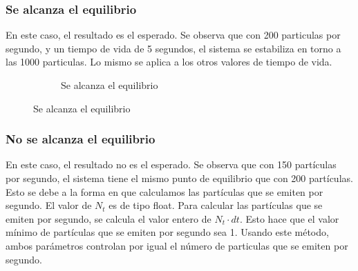 \documentclass{article}
\begin{document}
\subsubsection{Se alcanza el equilibrio}

En este caso, el resultado es el esperado. Se observa que con 200 particulas por segundo, y un tiempo de vida de 5 segundos, el sistema se estabiliza en torno a las 1000 particulas. Lo mismo se aplica a los otros valores de tiempo de vida.

\begin{figure}[H]
    \centering
    \begin{subfigure}{0.48\textwidth}
        \centering
        \caption{Se alcanza el equilibrio}
        \label{fig:energy_vs_time_1A}
    \end{subfigure}
\end{figure}

\subsubsection{No se alcanza el equilibrio}

En este caso, el resultado no es el esperado. Se observa que con 150 partículas por segundo, el sistema tiene el mismo punto de equilibrio que con 200 partículas. Esto se debe a la forma en que calculamos las partículas que se emiten por segundo. El valor de $N_t$ es de tipo float. Para calcular las partículas que se emiten por segundo, se calcula el valor entero de $N_t \cdot dt$. Esto hace que el valor mínimo de partículas que se emiten por segundo sea 1. Usando este método, ambos parámetros controlan por igual el número de particulas que se emiten por segundo.
\end{document}
